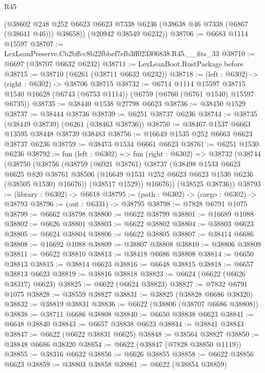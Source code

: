 \begin{lexlean}{R45}
\begin{coremodule}
{        (@38602 @248 @252 @6623 @6623 @7338 @6236 (@38638 @46 @7338 (@6867 (@38641 @46))) @38658))
      (@20942 @38549 @6232))
@38706 := @6683 @1114 @15597
@38707 := LexLeanPreserve.Cb2bffcc8b22fbbef7efb3ff023306838.R45.__fits_33
@38710 := @6697 (@38707 @6632 @6232)
@38711 := LexLeanBoot.RustPackage.before
@38715 := @38710 (@6261 (@38711 @6632 @6232))
@38718 := (left : @6302) -> (right : @6302) -> @38706 @38715
@38732 := @6714
    @1114
    @15597
    @38715
    @1540
    @16628
    (@6743 (@6753 @1114))
    (@6759 (@6760 (@6761 @1540) @15597 @6735))
@38735 := @38440 @1538 @27798 @6623
@38736 := @38450 @1529
@38737 := @38444 @38736
@38739 := @6251 @38737 @6236
@38744 := @38735 (@38449 @38739) (@6261 (@38463 @38736))
@38750 := @38467 @1537 @6663 @13595 @38448 @38739 @38483
@38756 := @16649 @1535 @252 @6663 @6623 @38737 @6236
@38759 := @38473 @1534 @6661 @6623
@38761 := @6251 @1530 @6236
@38792 := fun (left : @6302) =>
  fun (right : @6302) =>
  @38732
    (@38744
      (@38750
        (@38756
          (@38759
            (@6921 @38761)
            @38737
            (@38498
              @1533
              @6623
              @6625
              @820
              @38761
              @38506
              (@16649 @1531 @252 @6623 @6623 @1530 @6236 (@38505 @1530) @16676))
            (@38517 @1529))
          @16676))
      (@38525 @38736))
@38793 := (library : @6302) -> @6618
@38795 := (path : @6302) -> (cargo : @6302) -> @38793
@38796 := (out : @6331) -> @38795
@38798 := @7828 @6791 @1075
@38799 := @6662 @38798
@38800 := @6622 @38799
@38801 := @16689 @1088
@38802 := @6626 @38801
@38803 := @6622 @38802
@38804 := @38803 @6623
@38805 := @6624 @38804
@38806 := @6622 @38805
@38807 := @38414 @6686
@38808 := @16692 @1088
@38809 := @38807 @38808
@38810 := @38806 @38809
@38811 := @6622 @38810
@38813 := @38418 @6686 @38808
@38814 := @6650 @38813
@38815 := @38814 @6623
@38816 := @6648 @38815
@38818 := @6657 @38813 @6623
@38819 := @38816 @38818
@38823 := @6624 (@6622 (@6626 @38317) @6623)
@38825 := @6622 (@6624 @38823)
@38827 := @7832 @6791 @1075
@38828 := @38559 @38827
@38831 := @38825 (@38828 @6686 @38320)
@38832 := @38819 @38831
@38836 := @6622 (@38806 (@38707 @6686 @38808))
@38838 := @38711 @6686 @38808
@38840 := @6650 @38838 @6623
@38841 := @6648 @38840
@38843 := @6657 @38838 @6623
@38844 := @38841 @38843
@38847 := @6622 (@6622 @38831 @6625)
@38848 := @38564 @38827
@38850 := @38848 @6686 @38320
@38854 := @6622 (@38847 (@7828 @38850 @1119))
@38855 := @38316 @6632
@38856 := @6626 @38855
@38858 := @6622 @38856 @6623
@38859 := @38803 @38858
@38861 := @6622 (@38854 @38859)
}
\end{coremodule}
\end{lexlean}
